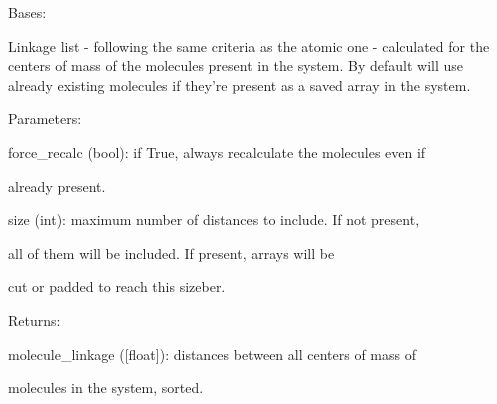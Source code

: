 \documentclass[letterpaper,10pt,english]{sphinxmanual}
\begin{document}
\begin{fulllineitems}
\label{doctree/soprano.properties.linkage.linkage:soprano.properties.linkage.linkage.MoleculeCOMLinkage}
Bases: {\hyperref[doctree/soprano.properties.atomsproperty:soprano.properties.atomsproperty.AtomsProperty]{\emph{}}}

Linkage list - following the same criteria as the atomic one - calculated
for the centers of mass of the molecules present in the system. By default
will use already existing molecules if they're present as a saved array in
the system.

\begin{DUlineblock}{0em}
\item[] Parameters:
\item[]
\begin{DUlineblock}{\DUlineblockindent}
\item[] force\_recalc (bool): if True, always recalculate the molecules even if
\item[]
\begin{DUlineblock}{\DUlineblockindent}
\item[] already present.
\end{DUlineblock}
\item[] size (int): maximum number of distances to include. If not present,
\item[]
\begin{DUlineblock}{\DUlineblockindent}
\item[] all of them will be included. If present, arrays will be
\item[] cut or padded to reach this sizeber.
\end{DUlineblock}
\end{DUlineblock}
\end{DUlineblock}

\begin{DUlineblock}{0em}
\item[] Returns:
\item[]
\begin{DUlineblock}{\DUlineblockindent}
\item[] molecule\_linkage ({[}float{]}): distances between all centers of mass of
\item[]
\begin{DUlineblock}{\DUlineblockindent}
\item[] molecules in the system, sorted.
\end{DUlineblock}
\end{DUlineblock}
\end{DUlineblock}


\end{fulllineitems}
\end{document}
